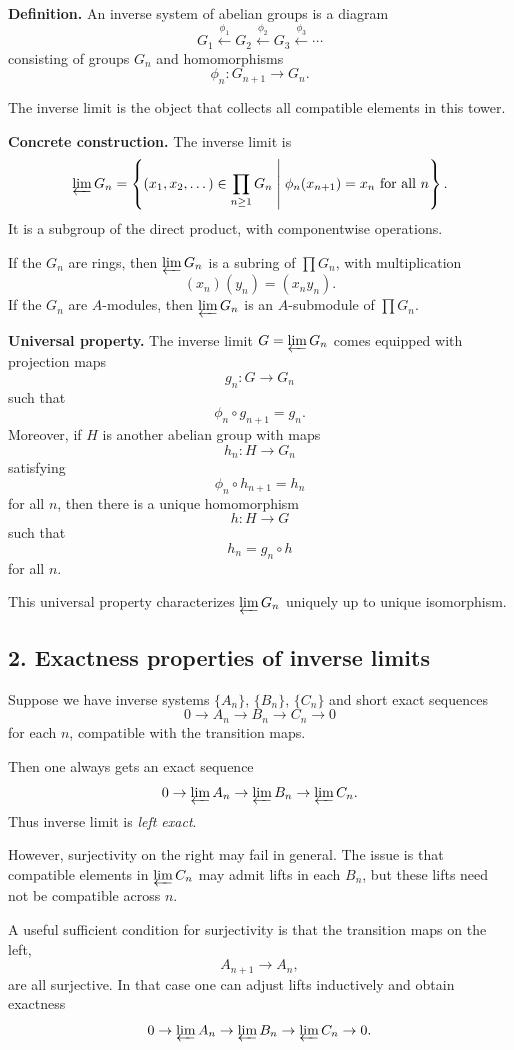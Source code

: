 \documentclass[12pt,a4paper]{article}
\theoremstyle{plain}
\theoremstyle{definition}      %
\begin{document}
\textbf{Definition.}
An inverse system of abelian groups is a diagram
\[
G_1 \xleftarrow{\phi_1} G_2 \xleftarrow{\phi_2} G_3 \xleftarrow{\phi_3}\cdots
\]
consisting of groups \(G_n\) and homomorphisms
\[
\phi_n:G_{n+1}\to G_n.
\]

The inverse limit is the object that collects all compatible elements in this tower.

\medskip
\textbf{Concrete construction.}
The inverse limit is
\[
\varprojlim G_n
=
\left\{
(x_1,x_2,\dots)\in \prod_{n\ge1} G_n
\;\middle|\;
\phi_n(x_{n+1})=x_n \text{ for all }n
\right\}.
\]
It is a subgroup of the direct product, with componentwise operations.

If the \(G_n\) are rings, then \(\varprojlim G_n\) is a subring of \(\prod G_n\), with multiplication
\[
(x_n)(y_n)=(x_ny_n).
\]
If the \(G_n\) are \(A\)-modules, then \(\varprojlim G_n\) is an \(A\)-submodule of \(\prod G_n\).

\medskip
\textbf{Universal property.}
The inverse limit \(G=\varprojlim G_n\) comes equipped with projection maps
\[
g_n:G\to G_n
\]
such that
\[
\phi_n\circ g_{n+1}=g_n.
\]
Moreover, if \(H\) is another abelian group with maps
\[
h_n:H\to G_n
\]
satisfying
\[
\phi_n\circ h_{n+1}=h_n
\]
for all \(n\), then there is a unique homomorphism
\[
h:H\to G
\]
such that
\[
h_n=g_n\circ h
\]
for all \(n\).

This universal property characterizes \(\varprojlim G_n\) uniquely up to unique isomorphism.

\subsection*{2. Exactness properties of inverse limits}

Suppose we have inverse systems \(\{A_n\}\), \(\{B_n\}\), \(\{C_n\}\) and short exact sequences
\[
0\to A_n\to B_n\to C_n\to 0
\]
for each \(n\), compatible with the transition maps.

Then one always gets an exact sequence
\[
0\to \varprojlim A_n \to \varprojlim B_n \to \varprojlim C_n.
\]
Thus inverse limit is \emph{left exact}.

However, surjectivity on the right may fail in general. The issue is that compatible elements in \(\varprojlim C_n\) may admit lifts in each \(B_n\), but these lifts need not be compatible across \(n\).

A useful sufficient condition for surjectivity is that the transition maps on the left,
\[
A_{n+1}\to A_n,
\]
are all surjective. In that case one can adjust lifts inductively and obtain exactness
\[
0\to \varprojlim A_n \to \varprojlim B_n \to \varprojlim C_n \to 0.
\]
\end{document}

